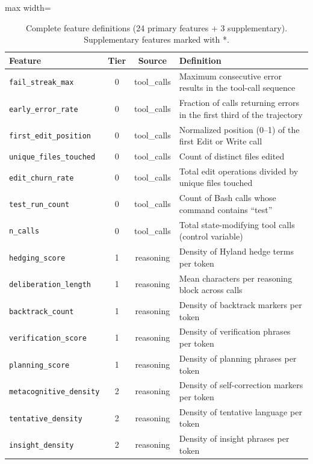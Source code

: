 \documentclass[11pt]{article}
\newcommand{\feat}[1]{\texttt{#1}}
\begin{document}
\begin{table}[t]
\centering
\caption{Complete feature definitions (24 primary features + 3 supplementary). Supplementary features marked with *.}
\label{tab:features}
\small
\begin{adjustbox}{max width=\textwidth}
\begin{tabular}{p{4cm}ccp{6.5cm}}
\toprule
\textbf{Feature} & \textbf{Tier} & \textbf{Source} & \textbf{Definition} \\
\midrule
\feat{fail\_streak\_max}       & 0 & tool\_calls & Maximum consecutive error results in the tool-call sequence \\
\feat{early\_error\_rate}      & 0 & tool\_calls & Fraction of calls returning errors in the first third of the trajectory \\
\feat{first\_edit\_position}   & 0 & tool\_calls & Normalized position (0--1) of the first Edit or Write call \\
\feat{unique\_files\_touched}  & 0 & tool\_calls & Count of distinct files edited \\
\feat{edit\_churn\_rate}       & 0 & tool\_calls & Total edit operations divided by unique files touched \\
\feat{test\_run\_count}        & 0 & tool\_calls & Count of Bash calls whose command contains ``test'' \\
\feat{n\_calls}                & 0 & tool\_calls & Total state-modifying tool calls (control variable) \\
\feat{hedging\_score}          & 1 & reasoning & Density of Hyland hedge terms per token \\
\feat{deliberation\_length}    & 1 & reasoning & Mean characters per reasoning block across calls \\
\feat{backtrack\_count}        & 1 & reasoning & Density of backtrack markers per token \\
\feat{verification\_score}     & 1 & reasoning & Density of verification phrases per token \\
\feat{planning\_score}         & 1 & reasoning & Density of planning phrases per token \\
\feat{metacognitive\_density}  & 2 & reasoning & Density of self-correction markers per token \\
\feat{tentative\_density}      & 2 & reasoning & Density of tentative language per token \\
\feat{insight\_density}        & 2 & reasoning & Density of insight phrases per token \\

\end{tabular}
\end{adjustbox}
\end{table}
\end{document}
